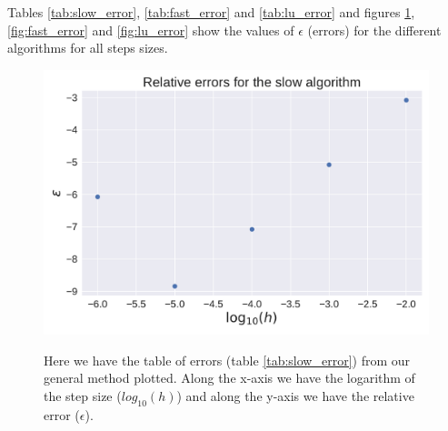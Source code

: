 \documentclass[reprint, english,notitlepage]{revtex4-1}  %
\begin{document}
Tables \ref{tab:slow_error}, \ref{tab:fast_error} and \ref{tab:lu_error} and figures \ref{fig:slow_error}, \ref{fig:fast_error} and \ref{fig:lu_error} show the values of $\epsilon$ (errors) for the different algorithms for all steps sizes.

\begin{table} [h]  %
  
	\caption{This table shows the relative error for our general method. The firs column is the logarithm of our step size and the second column is the relative error (see figure \ref{fig:slow_error} for table plotted).}
	\label{tab:slow_error}
\end{table}

\begin{table} [h]  %
  
	\caption{This table shows the relative error for our specialized method. The firs column is the logarithm of our step size and the second column is the relative error (see figure \ref{fig:fast_error} for table plotted).}
	\label{tab:fast_error}
\end{table}

\begin{table}  %
  
  \caption{This table shows the relative error for our LU decomposition method. The first column is the logarithm of our step size and the second column is the relative error (see figure \ref{fig:lu_error} for table plotted).}
	\label{tab:lu_error}
\end{table}

\begin{figure}[h]
	\centering
  \includegraphics[width=\linewidth]{../output/slow_errors.pdf}
	\label{fig:slow_error}
	\caption{Here we have the table of errors (table \ref{tab:slow_error}) from our general method plotted. Along the x-axis we have the logarithm of the step size ($log_{10}(h)$) and along the y-axis we have the relative error ($\epsilon$).}
\end{figure}
\end{document}
